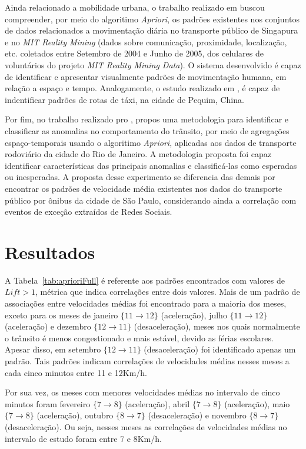 \documentclass[
	12pt,				%
	oneside,			%
	a4paper,			%
	english,			%
	brazil				%
	]{abntex2ppgsi}
\begin{document}
{{{Ainda relacionado a mobilidade urbana, o trabalho realizado em \cite{zeng2017visual} buscou compreender, por meio do algoritimo \textit{Apriori}, os padrões existentes nos conjuntos de dados relacionados a movimentação diária no transporte público de Singapura e no \textit{MIT Reality Mining} (dados sobre comunicação, proximidade, localização, etc. coletados entre Setembro de 2004 e Junho de 2005, dos celulares de voluntários do projeto \textit{MIT Reality Mining Data}). O sistema desenvolvido é capaz de identificar e apresentar visualmente padrões de movimentação humana, em relação a espaço e tempo. Analogamente, o estudo realizado em \cite{yu2018discovering}, é capaz de indentificar padrões de rotas de táxi, na cidade de Pequim, China.

Por fim, no trabalho realizado pro \cite{cruz2018detecccao},  propos uma metodologia para identificar e classificar as anomalias no comportamento do trânsito, por meio de agregações espaço-temporais usando o algoritimo \textit{Apriori}, aplicadas aos dados de transporte rodoviário  da cidade do Rio de Janeiro. A metodologia proposta foi capaz identificar características das principais anomalias e classificá-las como esperadas ou inesperadas. A proposta desse experimento se diferencia das demais por encontrar os padrões de velocidade média existentes nos dados do transporte público por ônibus da cidade de São Paulo, considerando ainda a correlação com eventos de exceção extraídos de Redes Sociais.

\section{Resultados}

A Tabela~\ref{tab:aprioriFull} é referente aos padrões encontrados com valores de $\textit{Lift} > 1$, métrica que indica correlações entre dois valores. Mais de um padrão de associações entre velocidades médias foi encontrado para a maioria dos meses, exceto para os meses de janeiro $\lbrace 11 \rightarrow 12 \rbrace$ (aceleração), julho $\lbrace 11 \rightarrow 12\rbrace$ (aceleração) e dezembro $\lbrace12 \rightarrow 11\rbrace$ (desaceleração), meses nos quais normalmente o trânsito é menos congestionado e mais estável, devido as férias escolares. Apesar disso, em setembro $\lbrace12 \rightarrow 11\rbrace$ (desaceleração) foi identificado apenas um padrão. Tais padrões indicam correlações de velocidades médias nesses meses a cada cinco minutos entre 11 e 12Km/h.

Por sua vez, os meses com menores velocidades médias no intervalo de cinco minutos foram fevereiro $\lbrace 7 \rightarrow 8\rbrace$ (aceleração), abril $\lbrace 7 \rightarrow 8 \rbrace$ (aceleração), maio $\lbrace7 \rightarrow 8\rbrace$ (aceleração), outubro $\lbrace8 \rightarrow 7\rbrace$ (desaceleração) e novembro $\lbrace8 \rightarrow 7\rbrace$ (desaceleração). Ou seja, nesses meses as correlações de velocidades médias no intervalo de estudo foram entre 7 e 8Km/h.

}}}
\end{document}
